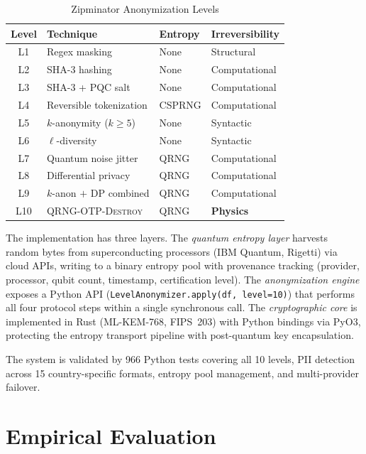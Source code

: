 \documentclass[acmsmall,screen,review,anonymous]{acmart}
\begin{document}
\begin{table}[t]
\caption{Zipminator Anonymization Levels}
\label{tab:levels}
\begin{center}
\begin{tabular}{@{}clll@{}}
\toprule
\textbf{Level} & \textbf{Technique} & \textbf{Entropy} & \textbf{Irreversibility} \\
\midrule
L1 & Regex masking & None & Structural \\
L2 & SHA-3 hashing & None & Computational \\
L3 & SHA-3 + PQC salt & None & Computational \\
L4 & Reversible tokenization & CSPRNG & Computational \\
L5 & $k$-anonymity ($k{\geq}5$) & None & Syntactic \\
L6 & $\ell$-diversity & None & Syntactic \\
L7 & Quantum noise jitter & QRNG & Computational \\
L8 & Differential privacy & QRNG & Computational \\
L9 & $k$-anon $+$ DP combined & QRNG & Computational \\
L10 & \textsc{QRNG-OTP-Destroy} & QRNG & \textbf{Physics} \\
\bottomrule
\end{tabular}
\end{center}
\end{table}

The implementation has three layers. The \emph{quantum entropy layer} harvests random bytes from superconducting processors (IBM Quantum, Rigetti) via cloud APIs, writing to a binary entropy pool with provenance tracking (provider, processor, qubit count, timestamp, certification level). The \emph{anonymization engine} exposes a Python API (\texttt{LevelAnonymizer.apply(df, level=10)}) that performs all four protocol steps within a single synchronous call. The \emph{cryptographic core} is implemented in Rust (ML-KEM-768, FIPS~203) with Python bindings via PyO3, protecting the entropy transport pipeline with post-quantum key encapsulation.

The system is validated by 966 Python tests covering all 10 levels, PII detection across 15 country-specific formats, entropy pool management, and multi-provider failover.

\section{Empirical Evaluation}
\label{sec:evaluation}
\end{document}

